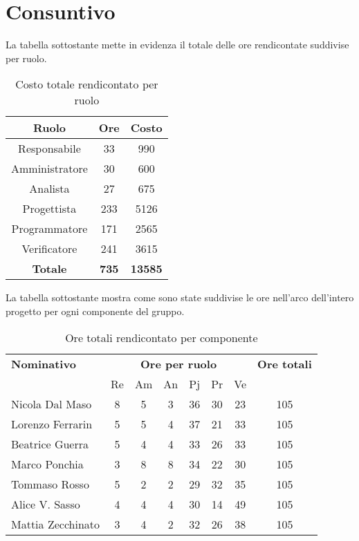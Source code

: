 \section{Consuntivo}
La tabella sottostante mette in evidenza il totale delle ore rendicontate suddivise per ruolo.
\begin{table}[H]
	\centering
	\begin{tabular}{|c|c|c|}
		\hline
		\textbf{Ruolo} &
		\textbf{Ore} &
		\textbf{Costo} \\
		\hline
		Responsabile & 33 & 990\\
		\hline
		Amministratore & 30 & 600\\
		\hline
		Analista & 27 & 675\\
		\hline
		Progettista & 233 & 5126 \\
		\hline
		Programmatore & 171 & 2565 \\
		\hline
		Verificatore & 241 & 3615\\
		\hline
		\textbf{Totale} & \textbf{735} & \textbf{13585} \\
		\hline
	\end{tabular}
	\caption{Costo totale rendicontato per ruolo}
\end{table}

La tabella sottostante mostra come sono state suddivise le ore nell'arco dell'intero progetto per ogni componente del gruppo.
\begin{table}[H]
	\centering
	\begin{tabular}{|l|c|c|c|c|c|c|c|}
		\hline
		\textbf{Nominativo} & 
		\multicolumn{6}{c|}{\textbf{Ore per ruolo}} & 
		\textbf{Ore totali} \\
		& Re & Am & An & Pj & Pr & Ve & \\
		\hline
		Nicola Dal Maso &8 &5 &3 &36 &30 &23 & 105 \\
		Lorenzo Ferrarin &5 &5 &4 &37 &21 &33 & 105 \\
		Beatrice Guerra &5 &4 &4 &33 &26 &33 & 105 \\
		Marco Ponchia &3 &8 &8 &34 &22 &30 & 105 \\
		Tommaso Rosso &5 &2 &2 &29 &32 &35 & 105 \\
		Alice V. Sasso &4 &4 &4 &30 &14 &49 & 105 \\
		Mattia Zecchinato &3 &4 &2 &32 &26 &38 & 105 \\
		\hline
	\end{tabular}
	\caption{Ore totali rendicontato per componente}
\end{table}

